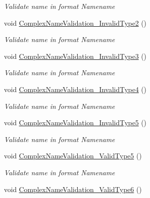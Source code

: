 \begin{DoxyCompactItemize}
\begin{DoxyCompactList}\small\item\em Validate name in format Name\textquotesingle{}name \end{DoxyCompactList}\item 
void \mbox{\hyperlink{class_authority_controller_1_1_tests_1_1_regex_a49fb8ae2d529c308b77bd43e447dd9b2}{Complex\+Name\+Validation\+\_\+\+Invalid\+Type2}} ()
\begin{DoxyCompactList}\small\item\em Validate name in format Name\textquotesingle{}name \end{DoxyCompactList}\item 
void \mbox{\hyperlink{class_authority_controller_1_1_tests_1_1_regex_a5282287c64ccd579ddc4055dc115fd8f}{Complex\+Name\+Validation\+\_\+\+Invalid\+Type3}} ()
\begin{DoxyCompactList}\small\item\em Validate name in format Name\textquotesingle{}name \end{DoxyCompactList}\item 
void \mbox{\hyperlink{class_authority_controller_1_1_tests_1_1_regex_aa214d85ea82735f3fe724d524a8b5b92}{Complex\+Name\+Validation\+\_\+\+Invalid\+Type4}} ()
\begin{DoxyCompactList}\small\item\em Validate name in format Name\textquotesingle{}name \end{DoxyCompactList}\item 
void \mbox{\hyperlink{class_authority_controller_1_1_tests_1_1_regex_a80a3c6ee4af7f8435b52573afd3ae550}{Complex\+Name\+Validation\+\_\+\+Invalid\+Type5}} ()
\begin{DoxyCompactList}\small\item\em Validate name in format Name\textquotesingle{}name \end{DoxyCompactList}\item 
void \mbox{\hyperlink{class_authority_controller_1_1_tests_1_1_regex_a36c6d878216653c9a9d3815d4232d02b}{Complex\+Name\+Validation\+\_\+\+Valid\+Type5}} ()
\begin{DoxyCompactList}\small\item\em Validate name in format Name\textquotesingle{}name \end{DoxyCompactList}\item 
void \mbox{\hyperlink{class_authority_controller_1_1_tests_1_1_regex_a8b1cf784e9fc984364e7e1693112a248}{Complex\+Name\+Validation\+\_\+\+Valid\+Type6}} ()

\end{DoxyCompactItemize}
